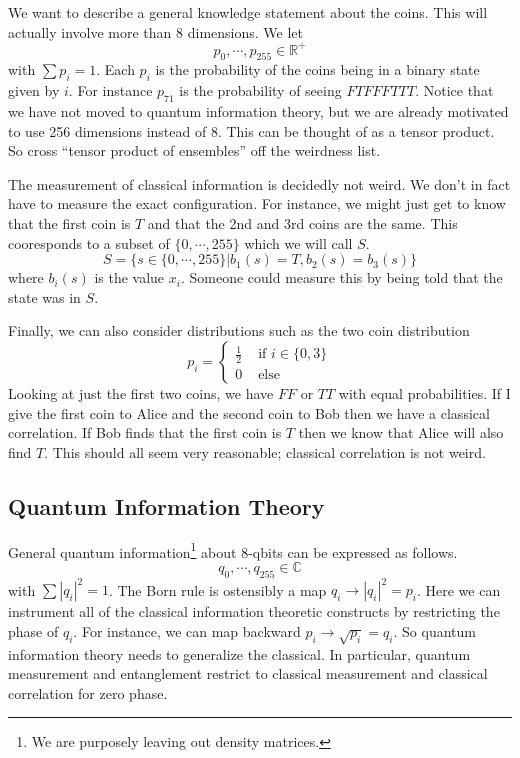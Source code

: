 \documentclass[12pt,a4paper]{article}
\begin{document}
We want to describe a general knowledge statement about the coins.  This will actually involve more than 8 dimensions.  We let
\[
   p_0,\cdots,p_{255} \in \mathbb{R}^+
\]
with $\sum p_i = 1$.  Each $p_i$ is the probability of the coins being in a binary state given by $i$.  For instance $p_{71}$ is the probability of seeing $FTFFFTTT$. Notice that we have not moved to quantum information theory, but we are already motivated to use 256 dimensions instead of 8.  This can be thought of as a tensor product.  So cross ``tensor product of ensembles'' off the weirdness list.

The measurement of classical information is decidedly not weird.  We don't in fact have to measure the exact configuration.  For instance, we might just get to know that the first coin is $T$ and that the 2nd and 3rd coins are the same.  This cooresponds to a subset of $\{0,\cdots,255\}$ which we will call $S$.
\[
   S = \{s \in \{0,\cdots,255\} | b_1(s) = T, b_2(s) = b_3(s) \}
\]
where $b_i(s)$ is the value $x_i$.  Someone could measure this by being told that the state was in $S$.


Finally, we can also consider distributions such as the two coin distribution
\[
p_i = 
\left\{
\begin{split}
\frac{1}{2} & \mbox{ if } i \in \{0,3\}\\
0 &\mbox{ else }
\end{split}
\right.
\]
Looking at just the first two coins, we have $FF$ or $TT$ with equal probabilities.  If I give the first coin to Alice and the second coin to Bob then we have a classical correlation.  If Bob finds that the first coin is $T$ then we know that Alice will also find $T$.  This should all seem very reasonable; classical correlation is not weird.

\subsection{Quantum Information Theory}
General quantum information\footnote{We are purposely leaving out density matrices.} about 8-qbits can be expressed as follows.
\[
   q_0,\cdots,q_{255} \in \mathbb{C}
\]
with $\sum |q_i|^2 = 1$.  The Born rule is ostensibly a map $q_i \rightarrow |q_i|^2 = p_i$.  Here we can instrument all of the classical information theoretic constructs by restricting the phase of $q_i$.  For instance, we can map backward $p_i \rightarrow \sqrt{p_i} = q_i$.  So quantum information theory needs to generalize the classical.  In particular, quantum measurement and entanglement restrict to classical measurement and classical correlation for zero phase.
\end{document}

